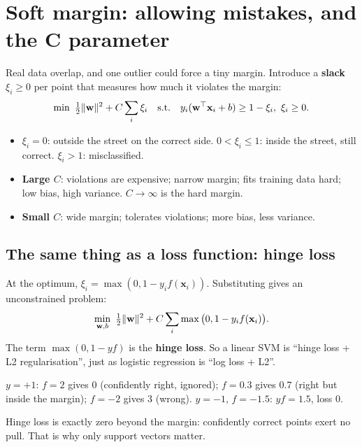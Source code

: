 \section{Soft margin: allowing mistakes, and the C parameter}
Real data overlap, and one outlier could force a tiny margin. Introduce a \textbf{slack} $\xi_i\ge0$ per point that measures how
much it violates the margin:
\[ \min\ \tfrac12\lVert \mathbf w\rVert^2 + C\sum_i\xi_i\quad\text{s.t.}\quad y_i(\mathbf w^\top\mathbf x_i + b)\ge1 - \xi_i,\ \xi_i\ge0. \]
\begin{itemize}
\item $\xi_i = 0$: outside the street on the correct side. $0<\xi_i\le1$: inside the street, still correct.
  $\xi_i > 1$: misclassified.
\item \textbf{Large $C$}: violations are expensive; narrow margin; fits training data hard; low bias, high variance.
  $C\to\infty$ is the hard margin.
\item \textbf{Small $C$}: wide margin; tolerates violations; more bias, less variance.
\end{itemize}

\subsection{The same thing as a loss function: hinge loss}
At the optimum, $\xi_i = \max(0, 1 - y_if(\mathbf x_i))$. Substituting gives an unconstrained problem:
\[ \min_{\mathbf w,b}\ \tfrac12\lVert \mathbf w\rVert^2 + C\sum_i\max\big(0, 1 - y_if(\mathbf x_i)\big). \]
The term $\max(0, 1 - yf)$ is the \textbf{hinge loss}. So a linear SVM is ``hinge loss + L2 regularisation'', just as logistic
regression is ``log loss + L2''.
\begin{example}
$y = +1$: $f = 2$ gives 0 (confidently right, ignored); $f = 0.3$ gives $0.7$ (right but inside the margin); $f = -2$ gives 3 (wrong).
$y = -1$, $f = -1.5$: $yf = 1.5$, loss 0.
\end{example}
Hinge loss is exactly zero beyond the margin: confidently correct points exert no pull. That is why only support vectors matter.

